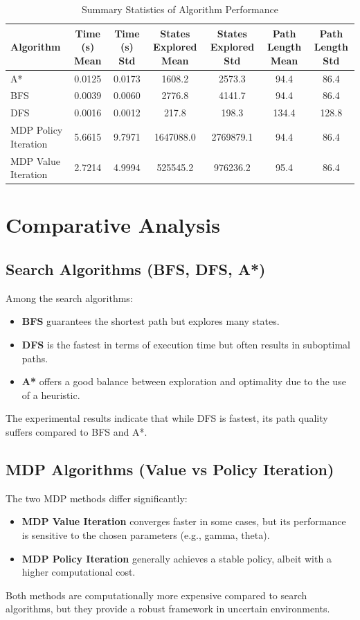 \documentclass{article}
\begin{document}
\begin{table}[h]
    \centering
    \caption{Summary Statistics of Algorithm Performance}
    \label{tab:summary_statistics}
    \begin{tabular}{lcccccc}
    \toprule
    Algorithm & Time (s) Mean & Time (s) Std & States Explored Mean & States Explored Std & Path Length Mean & Path Length Std \\
    \midrule
    A*                     & 0.0125  & 0.0173  & 1608.2   & 2573.3   & 94.4   & 86.4   \\
    BFS                    & 0.0039  & 0.0060  & 2776.8   & 4141.7   & 94.4   & 86.4   \\
    DFS                    & 0.0016  & 0.0012  & 217.8    & 198.3    & 134.4  & 128.8  \\
    MDP Policy Iteration   & 5.6615  & 9.7971  & 1647088.0& 2769879.1& 94.4   & 86.4   \\
    MDP Value Iteration    & 2.7214  & 4.9994  & 525545.2 & 976236.2 & 95.4   & 86.4   \\
    \bottomrule
    \end{tabular}
\end{table}

\section{Comparative Analysis}

\subsection{Search Algorithms (BFS, DFS, A*)}
Among the search algorithms:
\begin{itemize}
    \item \textbf{BFS} guarantees the shortest path but explores many states.
    \item \textbf{DFS} is the fastest in terms of execution time but often results in suboptimal paths.
    \item \textbf{A*} offers a good balance between exploration and optimality due to the use of a heuristic.
\end{itemize}
The experimental results indicate that while DFS is fastest, its path quality suffers compared to BFS and A*.

\subsection{MDP Algorithms (Value vs Policy Iteration)}
The two MDP methods differ significantly:
\begin{itemize}
    \item \textbf{MDP Value Iteration} converges faster in some cases, but its performance is sensitive to the chosen parameters (e.g., gamma, theta).
    \item \textbf{MDP Policy Iteration} generally achieves a stable policy, albeit with a higher computational cost.
\end{itemize}
Both methods are computationally more expensive compared to search algorithms, but they provide a robust framework in uncertain environments.
\end{document}
